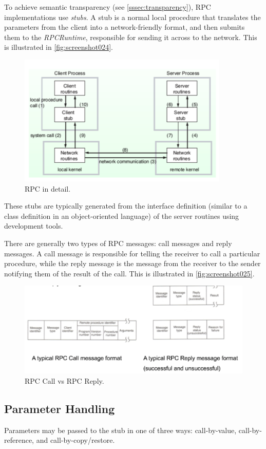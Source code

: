To achieve semantic transparency (see \autoref{sssec:transparency}), RPC implementations use \textit{stubs}. A stub is a normal local procedure that translates the parameters from the client into a network-friendly format, and then submits them to the \textit{RPCRuntime}, responsible for sending it across to the network. This is illustrated in \autoref{fig:screenshot024}.

\begin{figure}
\centering
\includegraphics[width=0.7\linewidth]{screenshot024}
\caption{RPC in detail.}
\label{fig:screenshot024}
\end{figure}

These stubs are typically generated from the interface definition (similar to a class definition in an object-oriented language) of the server routines using development tools. 

There are generally two types of RPC messages: call messages and reply messages. A call message is responsible for telling the receiver to call a particular procedure, while the reply message is the message from the receiver to the sender notifying them of the result of the call. This is illustrated in \autoref{fig:screenshot025}.

\begin{figure}
\centering
\includegraphics[width=0.7\linewidth]{screenshot025}
\caption{RPC Call vs RPC Reply.}
\label{fig:screenshot025}
\end{figure}

\subsection{Parameter Handling}
Parameters may be passed to the stub in one of three ways: call-by-value, call-by-reference, and call-by-copy/restore.

